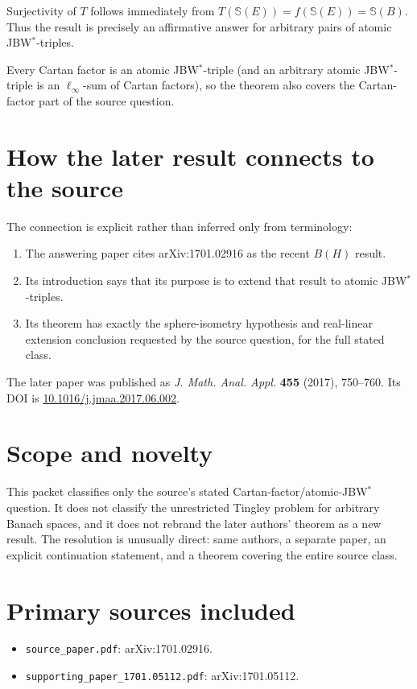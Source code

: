 \documentclass[11pt]{article}
\newcommand{\Sphere}{\mathbb S}
\begin{document}
Surjectivity of $T$ follows immediately from
$T(\Sphere(E))=f(\Sphere(E))=\Sphere(B)$.  Thus the result is precisely an
affirmative answer for arbitrary pairs of atomic JBW$^*$-triples.

Every Cartan factor is an atomic JBW$^*$-triple (and an arbitrary atomic
JBW$^*$-triple is an $\ell_\infty$-sum of Cartan factors), so the theorem also
covers the Cartan-factor part of the source question.

\section*{How the later result connects to the source}

The connection is explicit rather than inferred only from terminology:

\begin{enumerate}[leftmargin=2em]
\item The answering paper cites arXiv:1701.02916 as the recent $B(H)$ result.
\item Its introduction says that its purpose is to extend that result to
atomic JBW$^*$-triples.
\item Its theorem has exactly the sphere-isometry hypothesis and real-linear
extension conclusion requested by the source question, for the full stated
class.
\end{enumerate}

The later paper was published as \emph{J. Math. Anal. Appl.} \textbf{455}
(2017), 750--760.  Its DOI is \url{10.1016/j.jmaa.2017.06.002}.

\section*{Scope and novelty}

This packet classifies only the source's stated Cartan-factor/atomic-JBW$^*$
question.  It does not classify the unrestricted Tingley problem for arbitrary
Banach spaces, and it does not rebrand the later authors' theorem as a new
result.  The resolution is unusually direct: same authors, a separate paper,
an explicit continuation statement, and a theorem covering the entire source
class.

\section*{Primary sources included}

\begin{itemize}[leftmargin=2em]
\item \texttt{source\_paper.pdf}: arXiv:1701.02916.
\item \texttt{supporting\_paper\_1701.05112.pdf}: arXiv:1701.05112.
\end{itemize}
\end{document}
